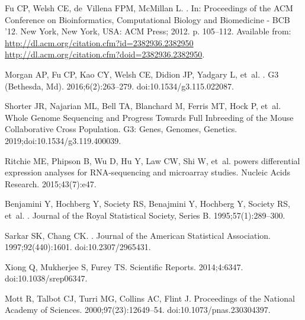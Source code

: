 \documentclass[10pt,letterpaper]{article}
\begin{document}
\begin{thebibliography}{10}
Fu CP, Welsh CE, de~Villena FPM, McMillan L.
.
\newblock In: Proceedings of the ACM Conference on Bioinformatics,
  Computational Biology and Biomedicine - BCB '12. New York, New York, USA: ACM
  Press; 2012. p. 105--112.
\newblock Available from:
  \url{http://dl.acm.org/citation.cfm?id=2382936.2382950
  http://dl.acm.org/citation.cfm?doid=2382936.2382950}.

Morgan AP, Fu CP, Kao CY, Welsh CE, Didion JP, Yadgary L, et~al.
.
\newblock G3 (Bethesda, Md). 2016;6(2):263--279.
\newblock doi:{10.1534/g3.115.022087}.

Shorter JR, Najarian ML, Bell TA, Blanchard M, Ferris MT, Hock P, et~al.
\newblock Whole Genome Sequencing and Progress Towards Full Inbreeding of the
  Mouse Collaborative Cross Population.
\newblock G3: Genes, Genomes, Genetics. 2019;doi:{10.1534/g3.119.400039}.

Ritchie ME, Phipson B, Wu D, Hu Y, Law CW, Shi W, et~al.
 powers differential expression analyses for {RNA}-sequencing
  and microarray studies.
\newblock Nucleic Acids Research. 2015;43(7):e47.

Benjamini Y, Hochberg Y, Society RS, Benajmini Y, Hochberg Y, Society RS,
  et~al.
.
\newblock Journal of the Royal Statistical Society, Series B.
  1995;57(1):289--300.

Sarkar SK, Chang CK.
.
\newblock Journal of the American Statistical Association. 1997;92(440):1601.
\newblock doi:{10.2307/2965431}.

Xiong Q, Mukherjee S, Furey TS.
\newblock Scientific Reports. 2014;4:6347.
\newblock doi:{10.1038/srep06347}.

Mott R, Talbot CJ, Turri MG, Collins AC, Flint J.
\newblock Proceedings of the National Academy of Sciences.
  2000;97(23):12649--54.
\newblock doi:{10.1073/pnas.230304397}.


\end{thebibliography}
\end{document}
